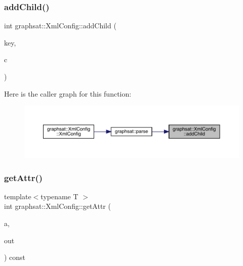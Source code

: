\subsubsection{\texorpdfstring{addChild()}{addChild()}}
{\footnotesize\ttfamily int graphsat\+::\+Xml\+Config\+::add\+Child (\begin{DoxyParamCaption}\item[{string}]{key,  }\item[{const \mbox{\hyperlink{classgraphsat_1_1_xml_config}{Xml\+Config}} $\ast$}]{c }\end{DoxyParamCaption})}

Here is the caller graph for this function\+:\nopagebreak
\begin{figure}[H]
\begin{center}
\leavevmode
\includegraphics[width=350pt]{classgraphsat_1_1_xml_config_a41c147d6ae9b486a591f94a24f40cd92_icgraph}
\end{center}
\end{figure}
\mbox{\label{classgraphsat_1_1_xml_config_a348451001c3d7c1f842fc77ad82cef81}} 
\subsubsection{\texorpdfstring{getAttr()}{getAttr()}\hspace{0.1cm}{\footnotesize\ttfamily [1/4]}}
{\footnotesize\ttfamily template$<$typename T $>$ \\
int graphsat\+::\+Xml\+Config\+::get\+Attr (\begin{DoxyParamCaption}\item[{const string \&}]{a,  }\item[{T \&}]{out }\end{DoxyParamCaption}) const\hspace{0.3cm}{\ttfamily [inline]}}

